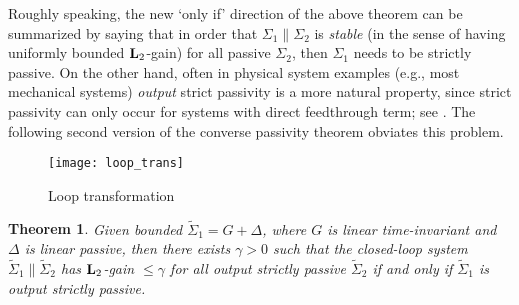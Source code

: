 \documentclass[11pt]{article}
\newtheorem{thm}[lemma]{Theorem}
\newcommand{\Ltwo}{\boldsymbol{\rm L}_{2}}
\begin{document}
Roughly speaking, the new `only if' direction of the above theorem can be summarized by saying that in order that $\Sigma_1 \| \Sigma_2$ is {\it stable} (in the sense of having uniformly bounded $\Ltwo$-gain) for all passive $\Sigma_2$, then $\Sigma_1$ needs to be strictly passive. 
On the other hand, often in physical system examples (e.g., most mechanical systems) {\it output} strict passivity is a more natural property, since strict passivity can only occur for systems with direct feedthrough term;  see \cite[Proposition 4.1.2]{Sch17}. The following second version of the converse passivity theorem obviates this problem.

\setlength{\unitlength}{0.7cm}
\begin{figure}[h]
  \centering 
  \texttt{[image: loop\_trans]}
  \caption{Loop transformation} \label{fig: loop_trans}
\end{figure}

\begin{thm}
\label{thm: passive2}
Given bounded  $\widetilde{\Sigma}_1 = G + \Delta$, where $G$ is linear time-invariant and $\Delta$ is linear passive, then
there exists $\gamma >0$ such that the closed-loop system $\widetilde{\Sigma}_1 \| \widetilde{\Sigma}_2$ has $\Ltwo$-gain $\leq \gamma$ for {\it all}
 output strictly passive $\widetilde{\Sigma}_2$ if and only if $\widetilde{\Sigma}_1$ is output strictly passive.
\end{thm}
\end{document}
